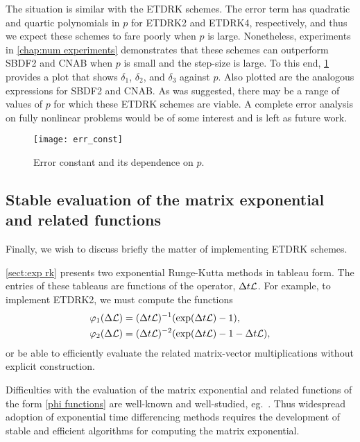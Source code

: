 The situation is similar with the ETDRK schemes. The error term has quadratic and quartic polynomials in $p$ for ETDRK2 and ETDRK4, respectively, and thus we expect these schemes to fare poorly when $p$ is large. Nonetheless, experiments in \cref{chap:num experiments} demonstrates that these schemes can outperform SBDF2 and CNAB when $p$ is small and the step-size is large. To this end, \cref{fig:err p dep} provides a plot that shows $\delta_1$, $\delta_2$, and $\delta_3$ against $p$. Also plotted are the analogous expressions for SBDF2 and CNAB. As was suggested, there may be a range of values of $p$ for which these ETDRK schemes are viable. A complete error analysis on fully nonlinear problems would be of some interest and is left as future work.

\begin{figure}[htb!]
        \centering
\texttt{[image: err\_const]}
\caption[Error constant and its dependence on $p$]{Error constant and its dependence on $p$. }
\label{fig:err p dep}
\end{figure}

\subsection{Stable evaluation of the matrix exponential and related functions}
Finally, we wish to discuss briefly the matter of implementing ETDRK schemes.

\cref{sect:exp rk} presents two exponential Runge-Kutta methods in tableau form. The entries of these tableaus are functions of the operator, $\Delta t\mathcal{L}$. For example, to implement ETDRK2, we must compute the functions 
\begin{align}
\varphi_1(\Delta \mathcal{L}) &= (\Delta t \mathcal{L})^{-1}(\exp(\Delta t \mathcal{L}) - 1),
\\
\varphi_2(\Delta \mathcal{L}) &= (\Delta t\mathcal{L})^{-2}(\exp(\Delta t \mathcal{L})  -1 - \Delta t \mathcal{L}) ,
\end{align}
or be able to efficiently evaluate the related matrix-vector multiplications without explicit construction.

Difficulties with the evaluation of the matrix exponential and related functions of the form \cref{phi functions} are well-known and well-studied, eg.\ \cite{moler2003nineteen,higham2002accuracy,higham2008functions,hochbruck1997krylov}. Thus widespread adoption of exponential time differencing methods requires the development of stable and efficient algorithms for computing the matrix exponential. 

